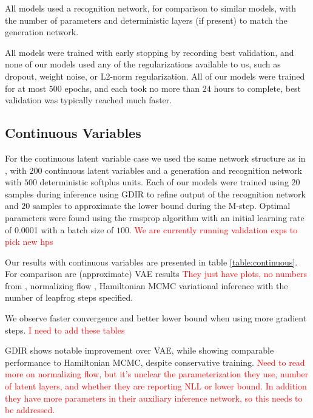 \documentclass{article} %
\newcommand{\alert}[1]{\textcolor{red}{#1}}
\begin{document}
All models used a recognition network, for comparison to similar models, with the number of parameters and deterministic layers (if present) to match the generation network.

All models were trained with early stopping by recording best validation, and none of our models used any of the regularizations available to us, such as dropout, weight noise, or L2-norm regularization. All of our models were trained for at most $500$ epochs, and each took no more than $24$ hours to complete, best validation was typically reached much faster.

\subsection{Continuous Variables}
For the continuous latent variable case we used the same network structure as in \citep{kingma2013auto, salimans2014markov}, with $200$ continuous latent variables and a generation and recognition network with $500$ deterministic softplus units. Each of our models were trained using $20$ samples during inference using GDIR to refine output of the recognition network and $20$ samples to approximate the lower bound during the M-step. Optimal parameters were found using the rmsprop algorithm \citep{Hinton-Coursera2012} with an initial learning rate of \num{0.0001} with a batch size of $100$. \alert{We are currently running validation exps to pick new hps}

Our results with continuous variables are presented in table \ref{table:continuous}. For comparison are (approximate) VAE results \alert{They just have plots, no numbers} from \citep{kingma2013auto}, normalizing flow \citep{rezende2015variational}, Hamiltonian MCMC variational inference \citep{salimans2014markov} with the number of leapfrog steps specified.

We observe faster convergence and better lower bound when using more gradient steps. \alert{I need to add these tables}

GDIR shows notable improvement over VAE, while showing comparable performance to Hamiltonian MCMC, despite conservative training. \alert{Need to read more on normalizing flow, but it's unclear the parameterization they use, number of latent layers, and whether they are reporting NLL or lower bound. In addition they have more parameters in their auxiliary inference network, so this needs to be addressed.}
\end{document}

